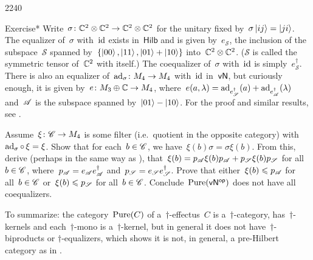 \begin{parsec}{2240}
\begin{point}{70}{Exercise*}
Write~$\sigma\colon \mathbb{C}^2 \otimes \mathbb{C}^2 \to \mathbb{C}^2 \otimes \mathbb{C}^2$
    for the unitary
    fixed by~$\sigma \ket{ij} = \ket{ji}$.
The equalizer of~$\sigma$ with~$\operatorname{id}$ exists in~$\mathsf{Hilb}$
    and is given by~$e_{\mathscr{S}}$, the inclusion
    of the subspace~$\mathscr{S}$
    spanned by~$\{\ket{00}, \ket{11}, \ket{01}+\ket{10}\}$
    into~$\mathbb{C}^2\otimes \mathbb{C}^2$.
    ($\mathscr{S}$ is called the symmetric tensor of~$\mathbb{C}^2$ with itself.)
    The coequalizer of~$\sigma$ with~$\operatorname{id}$ is simply~$e_{\mathscr{S}}^\dagger$.
    There is also an equalizer of~$\mathrm{ad}_{\sigma}\colon M_4 \to M_4$ with~$\operatorname{id}$
    in~$\mathsf{vN}$, but curiously enough, it is given
    by~$e \colon M_3 \oplus \mathbb{C} \to M_4$,
    where~$e(a,\lambda) =
            \mathrm{ad}_{e^\dagger_{\mathscr{S}}}(a) +
            \mathrm{ad}_{e^\dagger_{\mathscr{A}}}(\lambda)$
     and~$\mathscr{A}$ is the subspace spanned by~$\ket{01} - \ket{10}$.
     For the proof and similar results, see \cite{bags}.

Assume~$\xi \colon \mathscr{C} \to M_4$
    is some filter (i.e.~quotient in the opposite category)
    with~$\mathrm{ad}_\sigma \mathop{\circ} \xi = \xi$.
Show that for each~$b \in \mathscr{C}$,
        we have~$\xi(b) \sigma = \sigma \xi(b)$.
    From this, derive (perhaps in the same way as \cite{bags}),
    that~$\xi(b) = p_{\mathscr{A}} \xi(b) p_{\mathscr{A}}+ p_{\mathscr{S}} \xi(b) p_{\mathscr{S}}$
        for all~$b\in \mathscr{C}$,
        where~$p_{\mathscr{A}} = e_{\mathscr{A}} e_{\mathscr{A}}^\dagger$
        and~$p_{\mathscr{S}} = e_{\mathscr{S}} e_{\mathscr{S}}^\dagger$.
Prove that either~$\xi(b) \leqslant p_{\mathscr{A}}$ for all~$b\in \mathscr{C}$
    or~$\xi(b) \leqslant p_{\mathscr{S}}$ for all~$b \in \mathscr{C}$.
Conclude~$\operatorname{Pure}({\mathsf{vN}}{^{\mathsf{op}}})$ does not have all coequalizers.
\end{point}
\begin{point}{80}%
To summarize:
    the category~$\operatorname{Pure}(C)$
    of a~$\dagger$-effectus~$C$
    is a~$\dagger$-category,
    has~$\dagger$-kernels
    and each~$\dagger$-mono is a~$\dagger$-kernel,
    but in general it does not have~$\dagger$-biproducts or
        $\dagger$-equalizers,
        which shows it is not, in general,
        a pre-Hilbert category as in \cite[3.7.1]{heunenphd}.
\end{point}
\end{parsec}

